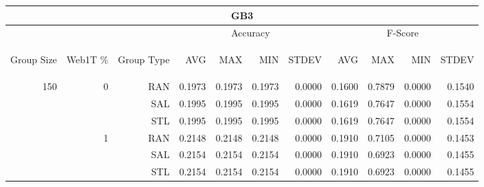 \begin{center}
\begin{table}[htbp] 
 \begin{center}
\begin{tabular}{ | r | r | r | r | r | r | r | r | r | r | r |}
\hline
\multicolumn{11}{|c|}{GB3}\\
\hline
 & & & \multicolumn{4}{|c|}{Accuracy} & \multicolumn{4}{|c|}{F-Score}\\ \cline{4-11}
\begin{sideways}Group Size\end{sideways} & \begin{sideways}Web1T \%\end{sideways} & \begin{sideways}Group Type\end{sideways} & \begin{sideways}AVG\end{sideways} & \begin{sideways}MAX\end{sideways} & \begin{sideways}MIN\end{sideways} & \begin{sideways}STDEV\end{sideways} & \begin{sideways}AVG\end{sideways} & \begin{sideways}MAX\end{sideways} & \begin{sideways}MIN\end{sideways} & \begin{sideways}STDEV\end{sideways}\\
\hline
\multirow{18}{*}{150}
 & \multirow{3}{*}{0} & RAN & 0.1973 & 0.1973 & 0.1973 & 0.0000 & 0.1600 & 0.7879 & 0.0000 & 0.1540\\ \cline{3-11}
 &   & SAL & 0.1995 & 0.1995 & 0.1995 & 0.0000 & 0.1619 & 0.7647 & 0.0000 & 0.1554\\ \cline{3-11}
 &   & STL & 0.1995 & 0.1995 & 0.1995 & 0.0000 & 0.1619 & 0.7647 & 0.0000 & 0.1554\\ \cline{2-11}
 & \multirow{3}{*}{1} & RAN & 0.2148 & 0.2148 & 0.2148 & 0.0000 & 0.1910 & 0.7105 & 0.0000 & 0.1453\\ \cline{3-11}
 &   & SAL & 0.2154 & 0.2154 & 0.2154 & 0.0000 & 0.1910 & 0.6923 & 0.0000 & 0.1455\\ \cline{3-11}
 &   & STL & 0.2154 & 0.2154 & 0.2154 & 0.0000 & 0.1910 & 0.6923 & 0.0000 & 0.1455\\ \cline{2-11}

\end{tabular}
\end{center}
\end{table}
\end{center}
